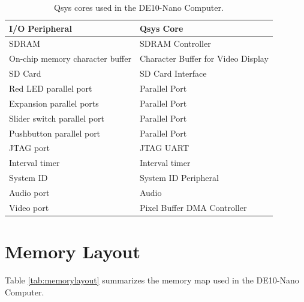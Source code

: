 \documentclass[11pt, twoside, pdftex]{article}
\newcommand{\commonFiles}{../../../common/doc}
\newcommand{\systemName}{DE10-Nano Computer}
\begin{document}






\begin{table}[h]
    \begin{center}
    \begin{tabular}{l|l}
            \textbf{I/O Peripheral}
            & \textbf{Qsys Core}
        \\\hline
            SDRAM
            & SDRAM Controller
        \\
            On-chip memory character buffer
				& Character Buffer for Video Display
        \\
            SD Card
        &   SD Card Interface
        \\
            Red LED parallel port
				& Parallel Port
        \\
            Expansion parallel ports
				& Parallel Port
        \\
            Slider switch parallel port
				& Parallel Port
        \\
            Pushbutton parallel port
				& Parallel Port
        \\
            JTAG port
				& JTAG UART
        \\
            Interval timer
				& Interval timer 
        \\
            System ID
				& System ID Peripheral
        \\
            Audio port
				& Audio
        \\
            Video port
				& Pixel Buffer DMA Controller
        \\
    \end{tabular}
    \caption{Qsys cores used in the \systemName.}
    \label{tab:sopcnames}
    \end{center}
\end{table}



\section{Memory Layout}
\label{sec:mm}

\noindent
Table \ref{tab:memorylayout} summarizes the memory map used in the DE10-Nano Computer.
~\\
\end{document}
